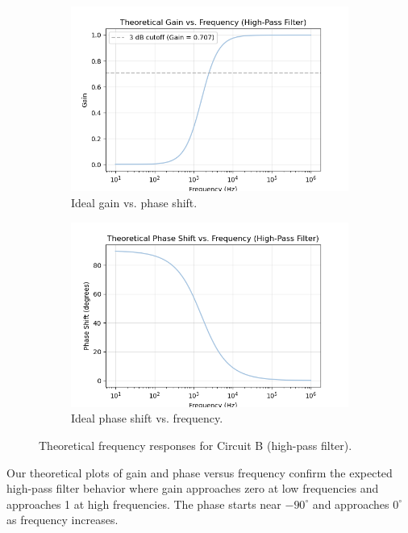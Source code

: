 \documentclass{article}
\begin{document}
\begin{figure}[H]
    \centering
    \begin{subfigure}[b]{0.48\textwidth}
        \centering
        \includegraphics[width=\linewidth]{2.3.b.gain.png}
        \caption{Ideal gain vs. phase shift.}
        \label{fig:highpass_gain}
    \end{subfigure}
    \hfill
    \begin{subfigure}[b]{0.48\textwidth}
        \centering
        \includegraphics[width=\linewidth]{2.3.b.phase.png}
        \caption{Ideal phase shift vs. frequency.}
        \label{fig:highpass_phase}
    \end{subfigure}
    \caption{Theoretical frequency responses for Circuit B (high-pass filter).}
    \label{fig:circuitB_theory}
\end{figure}


\noindent Our theoretical plots of gain and phase versus frequency confirm
the expected high-pass filter behavior where gain approaches zero at low
frequencies and approaches 1 at high frequencies. The phase starts near $-90^\circ$
and approaches $0^\circ$ as frequency increases.\\
\end{document}
